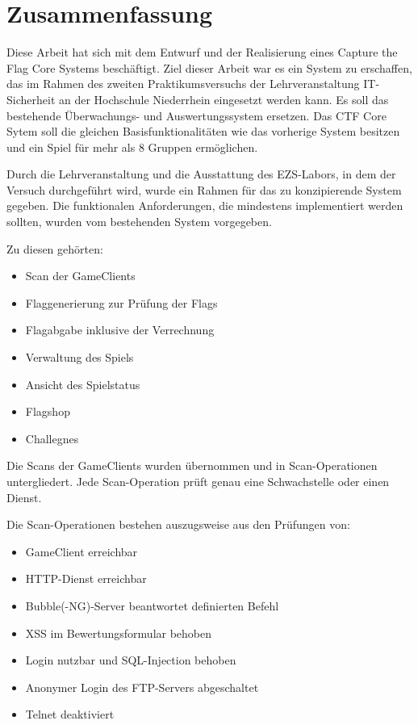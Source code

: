 \section{Zusammenfassung}
Diese Arbeit hat sich mit dem Entwurf und der Realisierung eines Capture the Flag Core Systems beschäftigt. Ziel dieser Arbeit war es ein System zu erschaffen, das im Rahmen des zweiten Praktikumsversuchs der Lehrveranstaltung IT-Sicherheit an der Hochschule Niederrhein eingesetzt werden kann. Es soll das bestehende Überwachungs- und Auswertungssystem ersetzen. Das CTF Core Sytem soll die gleichen Basisfunktionalitäten wie das vorherige System besitzen und ein Spiel für mehr als 8 Gruppen ermöglichen.

Durch die Lehrveranstaltung und die Ausstattung des EZS-Labors, in dem der Versuch durchgeführt wird, wurde ein Rahmen für das zu konzipierende System gegeben.
Die funktionalen Anforderungen, die mindestens implementiert werden sollten, wurden vom bestehenden System vorgegeben.

Zu diesen gehörten:
\begin{itemize}
	\item Scan der GameClients
	\item Flaggenerierung zur Prüfung der Flags
	\item Flagabgabe inklusive der Verrechnung
	\item Verwaltung des Spiels
	\item Ansicht des Spielstatus
	\item Flagshop
	\item Challegnes
\end{itemize}

Die Scans der GameClients wurden übernommen und in Scan-Operationen untergliedert. Jede Scan-Operation prüft genau eine Schwachstelle oder einen Dienst.

Die Scan-Operationen bestehen auszugsweise aus den Prüfungen von:
\begin{itemize}
	\item GameClient erreichbar
	\item HTTP-Dienst erreichbar
	\item Bubble(-NG)-Server beantwortet definierten Befehl
	\item XSS im Bewertungsformular behoben
	\item Login nutzbar und SQL-Injection behoben
	\item Anonymer Login des FTP-Servers abgeschaltet
	\item Telnet deaktiviert
\end{itemize}

